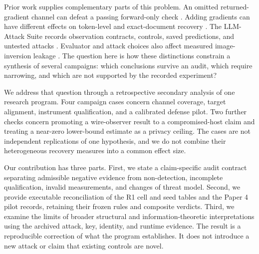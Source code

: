 \documentclass[11pt]{article}
\begin{document}
Prior work supplies complementary parts of this problem. An omitted
returned-gradient channel can defeat a passing forward-only check
\citep{paper1}. Adding gradients can have different effects on token-level
and exact-document recovery \citep{gradients2026}. The LLM-Attack Suite
records observation contracts, controls, saved predictions, and untested
attacks \citep{suite2026}. Evaluator and attack choices also affect
measured image-inversion leakage \citep{mia2026}. The question here is
how these distinctions constrain a synthesis of several campaigns: which
conclusions survive an audit, which require narrowing, and which are not
supported by the recorded experiment?

We address that question through a retrospective secondary analysis of
one research program. Four campaign cases concern channel coverage,
target alignment, instrument qualification, and a calibrated defense pilot.
Two further checks concern promoting a wire-observer result to a
compromised-host claim and treating a near-zero lower-bound estimate as a
privacy ceiling. The cases are not independent replications of one
hypothesis, and we do not combine their heterogeneous recovery measures
into a common effect size.

Our contribution has three parts. First, we state a claim-specific audit
contract separating admissible negative evidence from non-detection,
incomplete qualification, invalid measurements, and changes of threat model.
Second, we provide executable reconciliation of the R1 cell and seed tables
and the Paper 4 pilot records, retaining their frozen rules and composite
verdicts. Third, we examine the limits of broader structural and
information-theoretic interpretations using the archived attack, key,
identity, and runtime evidence. The result is a reproducible correction of
what the program establishes. It does not introduce a new attack or claim
that existing controls are novel.







\appendix

\end{document}
